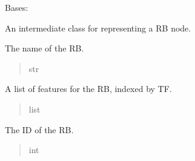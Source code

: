 \documentclass[letterpaper,10pt,english]{sphinxmanual}
\begin{document}
\begin{fulllineitems}
\label{\detokenize{nodes:nodes.nodeBuilder.RB}}
\pysigstartsignatures
\pysiglinewithargsret
{}
{\sphinxparamcomma {}\sphinxparamcomma {}}
{}
\pysigstopsignatures
\sphinxAtStartPar
Bases: {\hyperref[\detokenize{nodes:nodes.nodeBuilder.Token}]{}}

\sphinxAtStartPar
An intermediate class for representing a RB node.

\begin{fulllineitems}
\label{\detokenize{nodes:nodes.nodeBuilder.RB.name}}
\pysigstartsignatures
\pysigline
{}
\pysigstopsignatures
\sphinxAtStartPar
The name of the RB.
\begin{quote}\begin{description}
\sphinxAtStartPar
str

\end{description}\end{quote}

\end{fulllineitems}


\begin{fulllineitems}
\label{\detokenize{nodes:nodes.nodeBuilder.RB.features}}
\pysigstartsignatures
\pysigline
{}
\pysigstopsignatures
\sphinxAtStartPar
A list of features for the RB, indexed by TF.
\begin{quote}\begin{description}
\sphinxAtStartPar
list

\end{description}\end{quote}

\end{fulllineitems}


\begin{fulllineitems}
\label{\detokenize{nodes:nodes.nodeBuilder.RB.ID}}
\pysigstartsignatures
\pysigline
{}
\pysigstopsignatures
\sphinxAtStartPar
The ID of the RB.
\begin{quote}\begin{description}
\sphinxAtStartPar
int


\end{description}
\end{quote}
\end{fulllineitems}
\end{fulllineitems}
\end{document}
